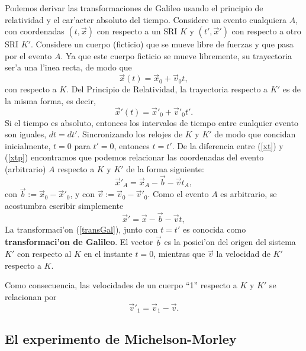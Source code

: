 Podemos derivar las transformaciones de Galileo usando el principio de
relatividad y el car'acter absoluto del tiempo. Considere un evento cualquiera
$A$, con coordenadas $(t,\vec{x})$ con respecto a un SRI $K$ y
$(t',\vec{x}') $ con respecto a otro SRI $K'$. Considere un cuerpo
(ficticio) que se mueve libre de fuerzas y que pasa por el evento $A$. Ya que
este cuerpo ficticio se mueve libremente, su trayectoria ser'a una l'inea recta,
de modo que
\begin{equation}
\vec{x}(t)=\vec{x}_0+\vec{v}_0 t, \label{xt}
\end{equation}
con respecto a $K$. Del Principio de Relatividad, la trayectoria respecto a $K'$
es de la misma forma, es decir,
\begin{equation}
\vec{x}'(t)=\vec{x}'_0+\vec{v}'_0 t'. \label{xtp}
\end{equation}
Si el tiempo es absoluto, entonces los intervalos de tiempo entre cualquier
evento son iguales, $dt=dt'$. Sincronizando los relojes de $K$ y $K'$ de modo
que concidan inicialmente, $t=0$ para $t'=0$, entonces $t=t'$. De la diferencia
entre (\ref{xt}) y (\ref{xtp}) encontramos que podemos relacionar las
coordenadas del evento (arbitrario) $A$ respecto a $K$ y $K'$ de la forma
siguiente:
\begin{equation}
\vec{x}'_A=\vec{x}_A-\vec{b}-\vec{v}t_A, \label{transGal0}
\end{equation}
con $\vec{b}:=\vec{x}_0-\vec{x}'_0$, y con $\vec{v}:=\vec{v}_0-\vec{v}'_0$. Como el evento $A$ es arbitrario, se acostumbra escribir simplemente
\begin{equation}
\vec{x}'=\vec{x}-\vec{b}-\vec{v}t, \label{transGal}
\end{equation}
 La transformaci'on  (\ref{transGal}), junto con $t=t'$ es conocida como \textbf{transformaci'on de Galileo}. El vector $\vec{b}$ es la posici'on del origen del sistema $K'$ con respecto al $K$ en el instante $t=0$, mientras que $\vec{v}$ la velocidad de $K'$ respecto a $K$.

Como consecuencia, las velocidades de un cuerpo ``1'' respecto a $K$ y $K'$ se relacionan por
\begin{equation}
\vec{v}'_1=\vec{v}_1-\vec{v}. \label{transGalv}
\end{equation}

\subsection{El experimento de Michelson-Morley}

